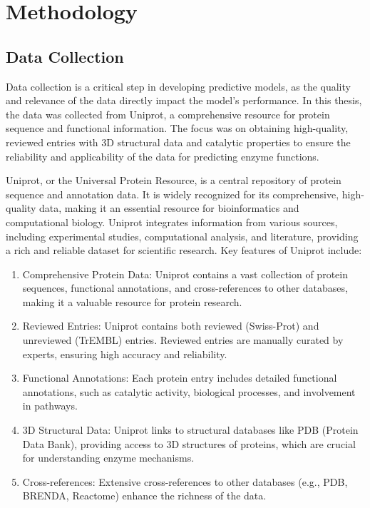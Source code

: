 \section{Methodology}

\subsection{Data Collection}
\label{sec:Data Collection}

Data collection is a critical step in developing predictive models, as the quality and relevance of the data directly impact the model's performance. In this thesis, the data was collected from Uniprot, a comprehensive resource for protein sequence and functional information. The focus was on obtaining high-quality, reviewed entries with 3D structural data and catalytic properties to ensure the reliability and applicability of the data for predicting enzyme functions. \autocite{uniprotconsortiumUniProtUniversalProtein2021}

Uniprot, or the Universal Protein Resource, is a central repository of protein sequence and annotation data. It is widely recognized for its comprehensive, high-quality data, making it an essential resource for bioinformatics and computational biology. Uniprot integrates information from various sources, including experimental studies, computational analysis, and literature, providing a rich and reliable dataset for scientific research.
Key features of Uniprot include:

\begin{enumerate}
    \item Comprehensive Protein Data: Uniprot contains a vast collection of protein sequences, functional annotations, and cross-references to other databases, making it a valuable resource for protein research.
    \item Reviewed Entries: Uniprot contains both reviewed (Swiss-Prot) and unreviewed (TrEMBL) entries. Reviewed entries are manually curated by experts, ensuring high accuracy and reliability.
    \item Functional Annotations: Each protein entry includes detailed functional annotations, such as catalytic activity, biological processes, and involvement in pathways.
    \item 3D Structural Data: Uniprot links to structural databases like PDB (Protein Data Bank), providing access to 3D structures of proteins, which are crucial for understanding enzyme mechanisms.
    \item Cross-references: Extensive cross-references to other databases (e.g., PDB, BRENDA, Reactome) enhance the richness of the data.
\end{enumerate}

